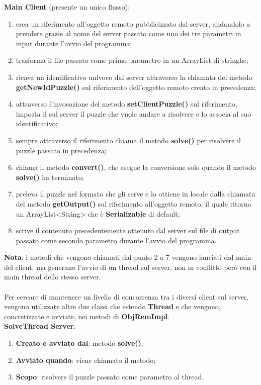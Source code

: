 \textbf{Main Client} (presente un unico flusso):
		\begin{enumerate}
			\item crea un riferimento all'oggetto remoto pubblicizzato dal server, andandolo a prendere grazie al nome del server passato come uno dei tre parametri in input durante l'avvio del programma;
			\item trasforma il file passato come primo parametro in un ArrayList di stringhe;
			\item ricava un identificativo univoco dal server attraverso la chiamata del metodo \textbf{getNewIdPuzzle()} sul riferimento dell'oggetto remoto creato in precedenza;
			\item attraverso l'invocazione del metodo \textbf{setClientPuzzle()} sul riferimento, imposta il sul server il puzzle che vuole andare a risolvere e lo associa al suo identificativo;
			\item sempre attraverso il riferimento chiama il metodo \textbf{solve()} per risolvere il puzzle passato in precedenza;
			\item chiama il metodo \textbf{convert()}, che esegue la conversione solo quando il metodo \textbf{solve()} ha terminato;
			\item preleva il puzzle nel formato che gli serve e lo ottiene in locale dalla chiamata del metodo \textbf{getOutput()} sul riferimento all'oggetto remoto, il quale ritorna un ArrayList<String> che è \textbf{Serializable} di default;
			\item scrive il contenuto precedentemente ottenuto dal server sul file di output passato come secondo parametro durante l'avvio del programma.
		\end{enumerate}
		\noindent
\textbf{Nota}: i metodi che vengono chiamati dal punto 2 a 7 vengono lanciati dal main del client, ma generano l'avvio di un thread sul server, non in conflitto però con il main thread dello stesso server. \\ \\

Per cercare di mantenere un livello di concorrenza tra i diversi client sul server, vengono utilizzate altre due classi che estendo \textbf{Thread} e che vengono, concretizzate e avviate, nei metodi di \textbf{ObjRemImpl}. \\
\textbf{SolveThread Server}:
	\begin{enumerate}
		\item \textbf{Creato e avviato dal}: metodo \textbf{solve()};
		\item \textbf{Avviato quando}: viene chiamato il metodo;
		\item \textbf{Scopo}: risolvere il puzzle passato come parametro al thread.
	\end{enumerate}
	\noindent
	

